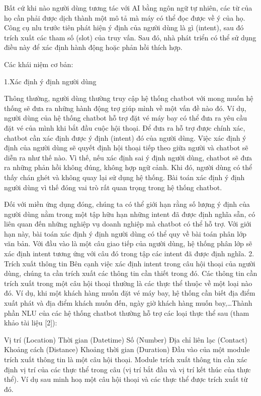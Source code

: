 Bất cứ khi nào người dùng tương tác với AI bằng ngôn ngữ tự nhiên, các từ của họ cần phải được dịch thành một mô tả mà máy có thể đọc được về ý của họ.
Công cụ \ac{nlu} trước tiên phát hiện ý định của người dùng là gì (intent), sau đó trích xuất các tham số (slot) của truy vấn. Sau đó, nhà phát triển có thể sử dụng điều này để xác định hành động hoặc phản hồi thích hợp.

Các khái niệm cơ bản:

1.Xác định ý định người dùng

Thông thường, người dùng thường truy cập hệ thống chatbot với mong muốn hệ thống sẽ đưa ra những hành động trợ giúp mình về một vấn đề nào đó. Ví dụ, người dùng của hệ thống chatbot hỗ trợ đặt vé máy bay có thể đưa ra yêu cầu đặt vé của mình khi bắt đầu cuộc hội thoại. Để đưa ra hỗ trợ được chính xác, chatbot cần xác định được ý định (intent) đó của người dùng. Việc xác định ý định của người dùng sẽ quyết định hội thoại tiếp theo giữa người và chatbot sẽ diễn ra như thế nào. Vì thế, nếu xác định sai ý định người dùng, chatbot sẽ đưa ra những phản hồi không đúng, không hợp ngữ cảnh. Khi đó, người dùng có thể thấy chán ghét và không quay lại sử dụng hệ thống. Bài toán xác định ý định người dùng vì thế đóng vai trò rất quan trọng trong hệ thống chatbot.

Đối với miền ứng dụng đóng, chúng ta có thể giới hạn rằng số lượng ý định của người dùng nằm trong một tập hữu hạn những intent đã được định nghĩa sẵn, có liên quan đến những nghiệp vụ doanh nghiệp mà chatbot có thể hỗ trợ. Với giới hạn này, bài toán xác định ý định người dùng có thể quy về bài toán phân lớp văn bản. Với đầu vào là một câu giao tiếp của người dùng, hệ thống phân lớp sẽ xác định intent tương ứng với câu đó trong tập các intent đã được định nghĩa.
2. Trích xuất thông tin
Bên cạnh việc xác định intent trong câu hội thoại của người dùng, chúng ta cần trích xuất các thông tin cần thiết trong đó. Các thông tin cần trích xuất trong một câu hội thoại thường là các thực thể thuộc về một loại nào đó. Ví dụ, khi một khách hàng muốn đặt vé máy bay, hệ thống cần biết địa điểm xuất phát và địa điểm khách muốn đến, ngày giờ khách hàng muốn bay,…Thành phần NLU của các hệ thống chatbot thường hỗ trợ các loại thực thể sau (tham khảo tài liệu [2]):

Vị trí (Location)
Thời gian (Datetime)
Số (Number)
Địa chỉ liên lạc (Contact)
Khoảng cách (Distance)
Khoảng thời gian (Duration)
Đầu vào của một module trích xuất thông tin là một câu hội thoại. Module trích xuất thông tin cần xác định vị trí của các thực thể trong câu (vị trí bắt đầu và vị trí kết thúc của thực thể). Ví dụ sau minh hoạ một câu hội thoại và các thực thể được trích xuất từ đó.

